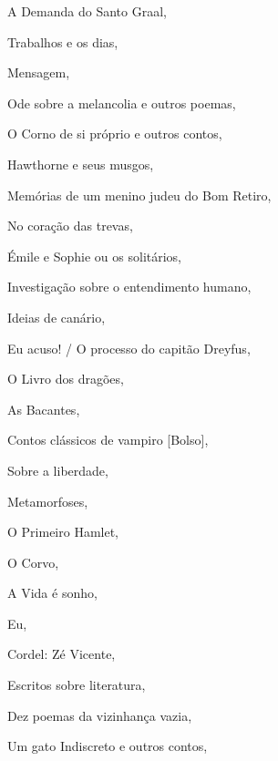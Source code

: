 \begin{multicols}{2}
\begin{enumerate}
{\item A Demanda do Santo Graal, {}
\item Trabalhos e os dias, {}
\item Mensagem, {}
\item Ode sobre a melancolia e outros poemas, {}
\item O Corno de si próprio e outros contos, {}
\item Hawthorne e seus musgos, {}
\item Memórias de um menino judeu do Bom Retiro, {}
\item No coração das trevas, {}
\item Émile e Sophie ou os solitários, {}
\item Investigação sobre o entendimento humano, {}
\item Ideias de canário, {}
\item Eu acuso! / O processo do capitão Dreyfus, {}
\item O Livro dos dragões, {}
\item As Bacantes, {}
\item Contos clássicos de vampiro [Bolso], {}
\item Sobre a liberdade, {}
\item Metamorfoses, {}
\item O Primeiro Hamlet, {}
\item O Corvo, {}
\item A Vida é sonho, {}
\item Eu, {}
\item Cordel: Zé Vicente, {}
\item Escritos sobre literatura, {}
\item Dez poemas da vizinhança vazia, {}
\item Um gato Indiscreto e outros contos, {}
}
\end{enumerate}
\end{multicols}
